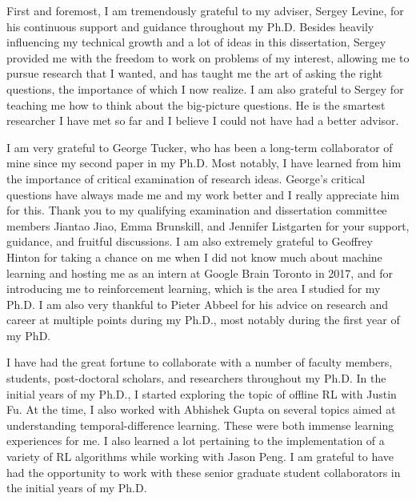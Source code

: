 First and foremost, I am tremendously grateful to my adviser, Sergey Levine, for his continuous support and guidance throughout my Ph.D. Besides heavily influencing my technical growth and a lot of ideas in this dissertation, Sergey provided me with the freedom to work on problems of my interest, allowing me to pursue research that I wanted, and has taught me the art of asking the right questions, the importance of which I now realize. I am also grateful to Sergey for teaching me how to think about the big-picture questions. He is the smartest researcher I have met so far and I believe I could not have had a better advisor.

I am very grateful to George Tucker, who has been a long-term collaborator of mine since my second paper in my Ph.D. Most notably, I have learned from him the importance of critical examination of research ideas. George's critical questions have always made me and my work better and I really appreciate him for this. Thank you to my qualifying examination and dissertation committee members Jiantao Jiao, Emma Brunskill, and Jennifer Listgarten for your support, guidance, and fruitful discussions. I am also extremely grateful to Geoffrey Hinton for taking a chance on me when I did not know much about machine learning and hosting me as an intern at Google Brain Toronto in 2017, and for introducing me to reinforcement learning, which is the area I studied for my Ph.D. I am also very thankful to Pieter Abbeel for his advice on research and career at multiple points during my Ph.D., most notably during the first year of my PhD.  

I have had the great fortune to collaborate with a number of faculty members, students, post-doctoral scholars, and researchers throughout my Ph.D. In the initial years of my Ph.D., I started exploring the topic of offline RL with Justin Fu. At the time, I also worked with Abhishek Gupta on several topics aimed at understanding temporal-difference learning. These were both immense learning experiences for me. I also learned a lot pertaining to the implementation of a variety of RL algorithms while working with Jason Peng. I am grateful to have had the opportunity to work with these senior graduate student collaborators in the initial years of my Ph.D. 

